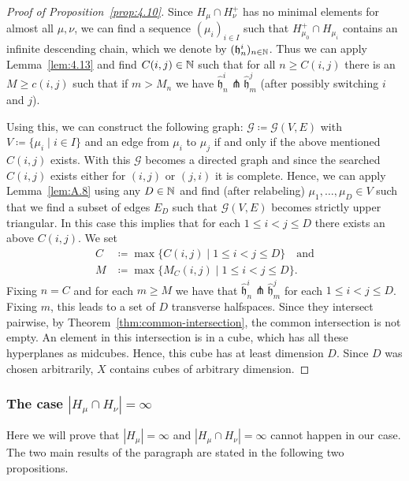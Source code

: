 \begin{proof}[Proof of Proposition~\ref{prop:4.10}]
  Since \(H_\mu \cap H_\nu^+\) has no minimal elements for almost all \(\mu, \nu\), we can find a sequence \((\mu_i)_{i \in I}\) such that \(H_{\mu_0}^+ \cap H_{\mu_i}\) contains an infinite descending chain, which we denote by \((\mathfrak{h}^i_n)_{n \in \mathbb{N}}\). Thus we can apply Lemma~\ref{lem:4.13} and find \(C(i,j) \in \mathbb{N}\) such that for all \(n \geq C(i,j)\) there is an \(M \geq c(i,j)\) such that if \(m > M_n\) we have \(\mathfrak{\hat h}_n^i \pitchfork \mathfrak{\hat h}_m^j\) (after possibly switching \(i\) and \(j\)).

  Using this, we can construct the following graph: \(\mathcal{G} \coloneqq \mathcal{G}(V,E)\) with \(V \coloneqq \{\mu_i \mid i \in I\}\) and an edge from \(\mu_i\) to \(\mu_j\) if and only if the above mentioned \(C(i,j)\) exists. With this \(\mathcal{G}\) becomes a directed graph and since the searched \(C(i,j)\) exists either for \((i,j)\) or \((j,i)\) it is complete. Hence, we can apply Lemma~\ref{lem:A.8} using any \(D \in \mathbb{N}\) and find (after relabeling) \(\mu_1, \dots, \mu_D \in V\) such that we find a subset of edges \(E_D\) such that \(\mathcal{G}(V,E)\) becomes strictly upper triangular. In this case this implies that for each \(1\leq i < j \leq D\) there exists an above \(C(i,j)\). We set
  \begin{align*}
    C &\coloneqq \max\{C(i,j) \mid 1 \leq i < j \leq D\} \quad \text{and}\\
    M &\coloneqq \max\{M_C(i,j) \mid 1 \leq i < j \leq D\}.
  \end{align*}
  Fixing \(n = C\) and for each \(m \geq M\) we have that \(\mathfrak{\hat h}_n^i \pitchfork \mathfrak{\hat h}_m^j\) for each \(1 \leq i < j \leq D\). Fixing \(m\), this leads to a set of \(D\) transverse halfspaces. Since they intersect pairwise,  by Theorem~\ref{thm:common-intersection}, the common intersection is not empty. An element in this intersection is in a cube, which has all these hyperplanes as midcubes. Hence, this cube has at least dimension \(D\). Since \(D\) was chosen arbitrarily, \(X\) contains cubes of arbitrary dimension.
\end{proof}

\subsubsection{The case \(|H_\mu \cap H_\nu| = \infty\)}
\label{sec:M=infty}

Here we will prove that \(|H_\mu| = \infty\) and \(|H_\mu \cap H_\nu| = \infty\) cannot happen in our case. The two main results of the paragraph are stated in the following two propositions.

